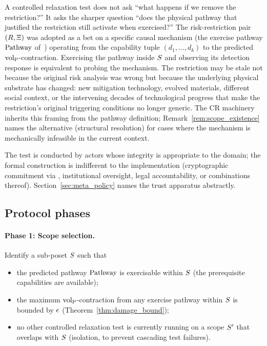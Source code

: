 \begin{remark}
\label{rem:physical_mechanism}
A controlled relaxation test does not ask ``what happens if we
remove the restriction?''  It asks the sharper question ``does the
physical pathway that justified the restriction still activate when
exercised?''  The risk-restriction pair $(R, \Xi)$ was
adopted as a bet on a specific causal mechanism (the exercise
pathway $\mathrm{Pathway}$
of~\citep[Definition~2]{lasser2026horizon}) operating from the
capability tuple $(d_1, \ldots, d_k)$ to the predicted
${\operatorname{vol}_{\mathrm{P}}}$-contraction.  Exercising the pathway inside $S$ and
observing its detection response is equivalent to probing the
mechanism.  The restriction may be stale not because the original
risk analysis was wrong but because the underlying physical
substrate has changed: new mitigation technology, evolved
materials, different social context, or the intervening decades
of technological progress that make the restriction's original
triggering conditions no longer generic.  The CR machinery
inherits this framing from the pathway definition;
Remark~\ref{rem:scope_existence} names the alternative
(structural resolution) for cases where the mechanism is
mechanically infeasible in the current context.

The test is conducted by actors whose integrity is appropriate to
the domain; the formal construction is indifferent to the
implementation (cryptographic commitment via
\citep{lasser2026exo}, institutional oversight, legal accountability,
or combinations thereof).  Section~\ref{sec:meta_policy} names the
trust apparatus abstractly.
\end{remark}

\subsection{Protocol phases}

\paragraph{Phase 1: Scope selection.}
Identify a sub-poset $S$ such that
\begin{itemize}
\item[(i)] the predicted pathway $\mathrm{Pathway}$ is exercisable within
  $S$ (the prerequisite capabilities are available);
\item[(ii)] the maximum ${\operatorname{vol}_{\mathrm{P}}}$-contraction from any exercise
  pathway within $S$ is bounded by $\epsilon$
  (Theorem~\ref{thm:damage_bound});
\item[(iii)] no other controlled relaxation test is currently
  running on a scope $S'$ that overlaps with $S$
  (isolation, to prevent cascading test failures).
\end{itemize}

